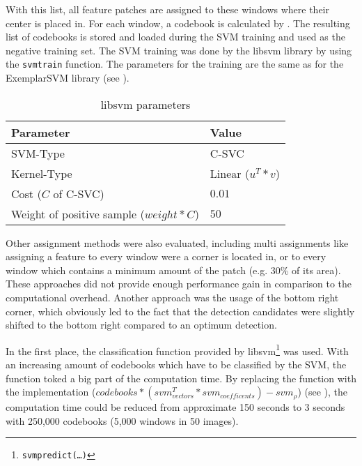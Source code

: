 With this list, all feature patches are assigned to these windows where their center is placed in. For each window, a codebook is calculated by . The resulting list of codebooks is stored and loaded during the \ac{SVM} training and used as the negative training set. The \ac{SVM} training was done by the libsvm library \cite{Chang:2011:LLS:1961189.1961199} by using the \texttt{svmtrain} function. The parameters for the training are the same as for the ExemplarSVM library \cite{Malisiewicz2011} (see ).

\begin{table}
    \begin{tabular}{|l|l|}
        \hline
        \textbf{Parameter} & \textbf{Value} \\ 
        \hline
        SVM-Type           & C-SVC \\ 
        \hline
        Kernel-Type        & Linear ($u^T*v$) \\ 
        \hline
        Cost ($C$ of C-SVC)  & $0.01$ \\ 
        \hline
        Weight of positive sample ($weight*C$) & $50$ \\ 
        \hline
    \end{tabular}
    \caption{libsvm parameters}
    \label{tab:libsvm_train_params}
\end{table}

Other assignment methods were also evaluated, including multi assignments like assigning a feature to every window were a corner is located in, or to every window which contains a minimum amount of the patch (e.g. 30\% of its area). These approaches did not provide enough performance gain in comparison to the computational overhead. Another approach was the usage of the bottom right corner, which obviously led to the fact that the detection candidates were slightly shifted to the bottom right compared to an optimum detection. 

In the first place, the classification function provided by libsvm\footnote{\texttt{svmpredict(\dots)}} was used. With an increasing amount of codebooks which have to be classified by the \ac{SVM}, the function toked a big part of the computation time. By replacing the function with the \MATLAB implementation ($codebooks * (svm_{vectors}^T * svm_{coefficents}) - svm_{\rho}$) (see ), the computation time could be reduced from approximate 150 seconds to 3 seconds with 250,000 codebooks (5,000 windows in 50 images).


